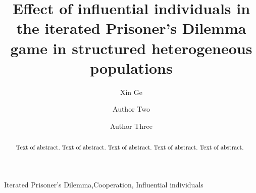 \documentclass[preprint,12pt,3p]{elsarticle}
\begin{document}
\begin{frontmatter}

\title{Effect of influential individuals in the iterated Prisoner's Dilemma game in structured heterogeneous populations}


\author[label1]{Xin Ge}
\address[label1]{DaLian Maritime University, School of Information Science and
technology, DaLian 116026, P.R. China}
\address[label2]{Address Two}



\author[label5]{Author Two}
\address[label5]{Some University}

\author[label1,label5]{Author Three}

\begin{abstract}
Text of abstract. Text of abstract. Text of abstract. Text of abstract. Text of abstract.
\end{abstract}

\begin{keyword}
Iterated Prisoner’s Dilemma,Cooperation, Influential individuals
\end{keyword}

\end{frontmatter}

\end{document}
